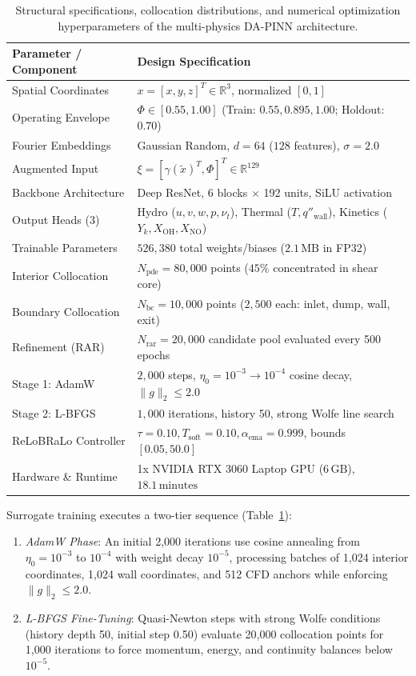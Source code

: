 \documentclass[reprint,aps,prfluids,superscriptaddress,twocolumn,floatfix]{revtex4-2}
\begin{document}
\begin{table}[t]
\centering
\caption{Structural specifications, collocation distributions, and numerical optimization hyperparameters of the multi-physics DA-PINN architecture.}
\label{tab:hyperparameters}
\small
\begin{tabular*}{\textwidth}{@{\extracolsep{\fill}}ll}
\toprule
Parameter / Component & Design Specification \\
\midrule
Spatial Coordinates & $x = [x, y, z]^T \in \mathbb{R}^3$, normalized $[0, 1]$ \\
Operating Envelope & $\Phi \in [0.55, 1.00]$ (Train: $0.55, 0.895, 1.00$; Holdout: $0.70$) \\
Fourier Embeddings & Gaussian Random, $d = 64$ ($128$ features), $\sigma = 2.0$ \\
Augmented Input & $\xi = [\gamma(\tilde{x})^T, \Phi]^T \in \mathbb{R}^{129}$ \\
Backbone Architecture & Deep ResNet, 6 blocks $\times$ 192 units, SiLU activation \\
Output Heads (3) & Hydro ($u, v, w, p, \nu_t$), Thermal ($T, q''_{\text{wall}}$), Kinetics ($Y_k, X_{\text{OH}}, X_{\text{NO}}$) \\
Trainable Parameters & $526,380$ total weights/biases ($2.1\,\text{MB}$ in FP32) \\
Interior Collocation & $N_{\text{pde}} = 80,000$ points ($45\%$ concentrated in shear core) \\
Boundary Collocation & $N_{\text{bc}} = 10,000$ points ($2,500$ each: inlet, dump, wall, exit) \\
Refinement (RAR) & $N_{\text{rar}} = 20{,}000$ candidate pool evaluated every 500 epochs \\
Stage 1: AdamW & $2,000$ steps, $\eta_0 = 10^{-3} \to 10^{-4}$ cosine decay, $\|g\|_2 \le 2.0$ \\
Stage 2: L-BFGS & $1,000$ iterations, history 50, strong Wolfe line search \\
ReLoBRaLo Controller & $\tau = 0.10, T_{\text{soft}} = 0.10, \alpha_{\text{ema}} = 0.999$, bounds $[0.05, 50.0]$ \\
Hardware \& Runtime & 1x NVIDIA RTX 3060 Laptop GPU ($6\,\text{GB}$), $18.1\,\text{minutes}$ \\
\bottomrule
\end{tabular*}
\end{table}

Surrogate training executes a two-tier sequence (Table~\ref{tab:hyperparameters}):
\begin{enumerate}
    \item \textit{AdamW Phase}: An initial 2,000 iterations use cosine annealing from $\eta_0 = 10^{-3}$ to $10^{-4}$ with weight decay $10^{-5}$, processing batches of 1,024 interior coordinates, 1,024 wall coordinates, and 512 CFD anchors while enforcing $\|g\|_2 \le 2.0$.
    \item \textit{L-BFGS Fine-Tuning}: Quasi-Newton steps with strong Wolfe conditions (history depth 50, initial step 0.50) evaluate 20,000 collocation points for 1,000 iterations to force momentum, energy, and continuity balances below $10^{-5}$.
\end{enumerate}
\end{document}
